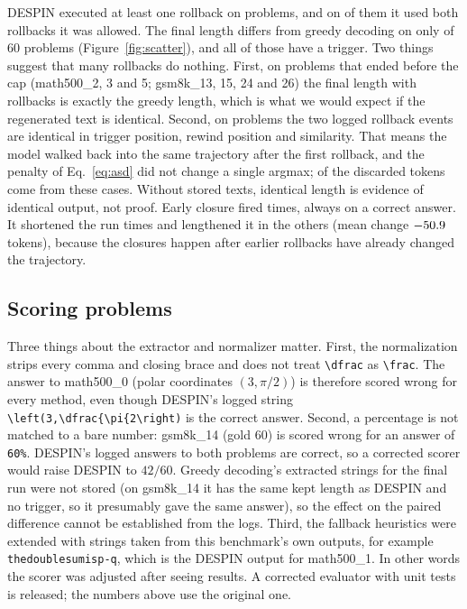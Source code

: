 \documentclass[11pt]{article}
\begin{document}
DESPIN executed at least one rollback on \statAsdProblems{} problems, and on \statAsdAtCap{} of them it used both rollbacks it was allowed. The final length differs from greedy decoding on only \statLenChanged{} of 60 problems (Figure~\ref{fig:scatter}), and all of those have a trigger. Two things suggest that many rollbacks do nothing. First, on \statNoopCount{} problems that ended before the cap (math500\_2, 3 and 5; gsm8k\_13, 15, 24 and 26) the final length with rollbacks is exactly the greedy length, which is what we would expect if the regenerated text is identical. Second, on \statDupProblems{} problems the two logged rollback events are identical in trigger position, rewind position and similarity. That means the model walked back into the same trajectory after the first rollback, and the penalty of Eq.~\eqref{eq:asd} did not change a single argmax; \statDupWasted{} of the \statPrunedTotal{} discarded tokens come from these cases. Without stored texts, identical length is evidence of identical output, not proof. Early closure fired \statPgecN{} times, always on a correct answer. It shortened the run \statPgecShorter{} times and lengthened it in the others (mean change $-50.9$ tokens), because the closures happen after earlier rollbacks have already changed the trajectory.

\subsection{Scoring problems}

Three things about the extractor and normalizer matter. First, the normalization strips every comma and closing brace and does not treat \texttt{\textbackslash dfrac} as \texttt{\textbackslash frac}. The answer to math500\_0 (polar coordinates $(3,\pi/2)$) is therefore scored wrong for every method, even though DESPIN's logged string \texttt{\textbackslash left(3,\allowbreak\textbackslash dfrac\{\allowbreak\textbackslash pi\{2\allowbreak\textbackslash right)} is the correct answer. Second, a percentage is not matched to a bare number: gsm8k\_14 (gold 60) is scored wrong for an answer of \texttt{60\%}. DESPIN's logged answers to both problems are correct, so a corrected scorer would raise DESPIN to $42/60$. Greedy decoding's extracted strings for the final run were not stored (on gsm8k\_14 it has the same kept length as DESPIN and no trigger, so it presumably gave the same answer), so the effect on the paired difference cannot be established from the logs. Third, the fallback heuristics were extended with strings taken from this benchmark's own outputs, for example \texttt{thedoublesumisp-q}, which is the DESPIN output for math500\_1. In other words the scorer was adjusted after seeing results. A corrected evaluator with unit tests is released; the numbers above use the original one.
\end{document}
